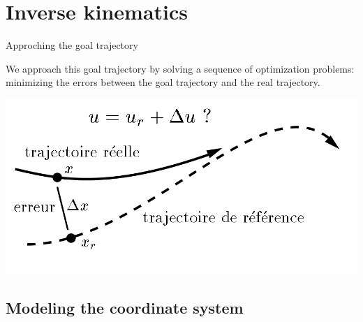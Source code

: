 \documentclass{beamer}
\begin{document}
%
%
\section{Inverse kinematics}


\begin{frame}{Approching the goal trajectory}

We approach this goal trajectory by solving a sequence of optimization problems: minimizing the errors between the goal trajectory and the real trajectory.
\medskip

\includegraphics[scale = 0.4]{tracking.jpg}\cite{2}
\end{frame}

\subsection{Modeling the coordinate system}
\end{document}
